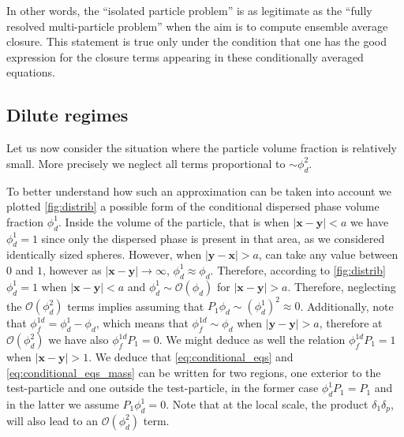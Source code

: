 In other words, the ``isolated particle problem'' is as legitimate as the ``fully resolved multi-particle problem'' when the aim is to compute ensemble average closure.
This statement is true only under the condition that one has the good expression for the closure terms appearing in these conditionally averaged equations. 

\subsection{Dilute regimes}
Let us now consider the situation where the particle volume fraction is relatively small. 
More precisely we neglect all terms proportional to $\sim \phi_d^2$. 

To better understand how such an approximation can be taken into account we plotted \ref{fig:distrib} a possible form of the conditional dispersed phase volume fraction $\phi_d^1$.
Inside the volume of the particle, that is when $|\textbf{x}-\textbf{y}| < a$ we have $\phi_d^1 = 1$ since only the dispersed phase is present in that area, as we considered identically sized spheres. 
However, when $|\textbf{y} - \textbf{x}| >a$, can take any value between $0$ and $1$, however as $|\textbf{x}- \textbf{y}|\to\infty$, $\phi_d^1 \approx \phi_d$.
Therefore, according to \ref{fig:distrib} $\phi_d^1 = 1$ when $|\textbf{x}-\textbf{y}| < a$  and $\phi_d^1 \sim \mathcal{O}(\phi_d)$ for $|\textbf{x}-\textbf{y}| > a$. 
Therefore, neglecting the $\mathcal{O}(\phi_d^2)$ terms  implies assuming that $P_1 \phi_d \sim (\phi_d^1)^2 \approx 0$. 
Additionally, note that $\phi_f^{1d} = \phi_d^1 - \phi_d$, which means that $\phi_f^{1d} \sim \phi_d$ when $|\textbf{y} -\textbf{y}| > a$, therefore at  $\mathcal{O}(\phi_d^2)$ we have also $\phi_f^{1d} P_1= 0$.
We might deduce as well the relation $\phi_f^{1d} P_1 = 1$ when $|\textbf{x}-\textbf{y}| >1$. 
We deduce that \ref{eq:conditional_eqs} and \ref{eq:conditional_eqs_mass} can be written for two regions, one exterior to the test-particle and one outside the test-particle, in the former case $\phi_d^1P_1  = P_1$ and in the latter we assume $P_1 \phi_d^1 = 0$. 
Note that at the local scale, the product $\delta_1\delta_p$, will also lead to an $\mathcal{O}(\phi_d^2)$ term.  

